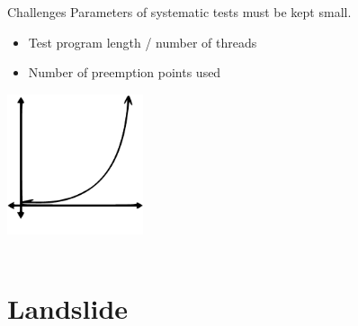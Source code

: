 \documentclass[xcolor=dvipsnames]{beamer}
\begin{document}
\begin{frame}{Challenges}
	Parameters of systematic tests must be kept small.
	\begin{itemize}
		\item Test program length / number of threads
		\item Number of preemption points used
	\end{itemize}
	\linegap

	\begin{center}
		\hspace{-0.25in}\includegraphics[width=0.3\textwidth]{expo.pdf} \\
		\vspace{-1.33in} \\
		\vspace{0.15in}\hspace{-0.25in}{\small number of PPs}
	\end{center}
\end{frame}


\section{Landslide}

\end{document}

